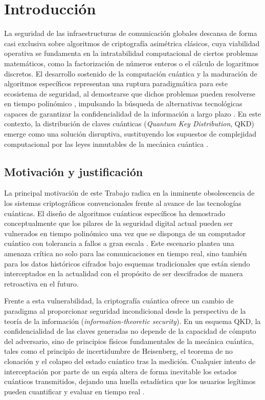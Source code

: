 \chapter{Introducción}

La seguridad de las infraestructuras de comunicación globales descansa de forma casi exclusiva sobre algoritmos de criptografía asimétrica clásicos, cuya viabilidad operativa se fundamenta en la intratabilidad computacional de ciertos problemas matemáticos, como la factorización de números enteros o el cálculo de logaritmos discretos. El desarrollo sostenido de la computación cuántica y la maduración de algoritmos específicos representan una ruptura paradigmática para este ecosistema de seguridad, al demostrarse que dichos problemas pueden resolverse en tiempo polinómico \citep{shor1994}, impulsando la búsqueda de alternativas tecnológicas capaces de garantizar la confidencialidad de la información a largo plazo \citep{nielsen2010}. En este contexto, la distribución de claves cuánticas (\emph{Quantum Key Distribution}, QKD) emerge como una solución disruptiva, sustituyendo los supuestos de complejidad computacional por las leyes inmutables de la mecánica cuántica \citep{gisin2002, scarani2009}.

\section{Motivación y justificación}

La principal motivación de este Trabajo radica en la inminente obsolescencia de los sistemas criptográficos convencionales frente al avance de las tecnologías cuánticas. El diseño de algoritmos cuánticos específicos ha demostrado conceptualmente que los pilares de la seguridad digital actual pueden ser vulnerados en tiempo polinómico una vez que se disponga de un computador cuántico con tolerancia a fallos a gran escala \citep{shor1994}. Este escenario plantea una amenaza crítica no solo para las comunicaciones en tiempo real, sino también para los datos históricos cifrados bajo esquemas tradicionales que están siendo interceptados en la actualidad con el propósito de ser descifrados de manera retroactiva en el futuro.

Frente a esta vulnerabilidad, la criptografía cuántica ofrece un cambio de paradigma al proporcionar seguridad incondicional desde la perspectiva de la teoría de la información (\emph{information-theoretic security}). En un esquema QKD, la confidencialidad de las claves generadas no depende de la capacidad de cómputo del adversario, sino de principios físicos fundamentales de la mecánica cuántica, tales como el principio de incertidumbre de Heisenberg, el teorema de no clonación \citep{wootters1982} y el colapso del estado cuántico tras la medición. Cualquier intento de interceptación por parte de un espía altera de forma inevitable los estados cuánticos transmitidos, dejando una huella estadística que los usuarios legítimos pueden cuantificar y evaluar en tiempo real \citep{gisin2002}.

